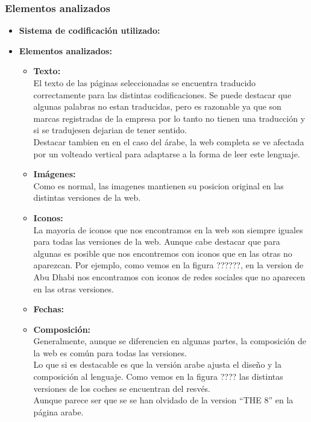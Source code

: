 \documentclass[a4paper,11pt]{article}
\begin{document}
\subsubsection{Elementos analizados}
\begin{itemize}
\item \textbf{Sistema de codificación utilizado:}\\
\item \textbf{Elementos analizados:}\\
\begin{itemize}
  \item \textbf{Texto:}\\
  El texto de las páginas seleccionadas se encuentra traducido correctamente para las distintas codificaciones. Se puede destacar que algunas palabras no estan traducidas, pero es razonable ya que son marcas registradas de la empresa por lo tanto no tienen una traducción y si se tradujesen dejarian de tener sentido.\\
  Destacar tambien en en el caso del árabe, la web completa se ve afectada por un volteado vertical para adaptarse a la forma de leer este lenguaje.

  \item \textbf{Imágenes:}\\
  Como es normal, las imagenes mantienen su posicion original en las distintas versiones de la web.

  \item \textbf{Iconos:}\\
  La mayoria de iconos que nos encontramos en la web son siempre iguales para todas las versiones de la web. Aunque cabe destacar que para algunas es posible que nos encontremos con iconos que en las otras no aparezcan. Por ejemplo, como vemos en la figura ??????, en la version de Abu Dhabi nos encontramos con iconos de redes sociales que no aparecen en las otras versiones.


  \item \textbf{Fechas:}\\

  \item \textbf{Composición:}\\
  Generalmente, aunque se diferencien en algunas partes, la composición de la web es común para todas las versiones.\\
  Lo que si es destacable es que la versión arabe ajusta el diseño y la composición al lenguaje. Como vemos en la figura ???? las distintas versiones de los coches se encuentran del resvés.\\
  Aunque parece ser que se se han olvidado de la version ``THE 8'' en la página arabe.


\end{itemize}
\end{itemize}
\end{document}
